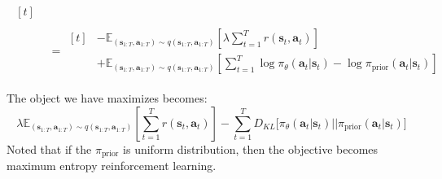 \begin{equation}
\begin{aligned}
\begin{aligned}[t]
        \end{aligned} \\ 
        &= \begin{aligned}[t]
            &-\mathbb{E}_{(\boldsymbol{s}_{1:T}, \boldsymbol{a}_{1:T}) \sim q(\boldsymbol{s}_{1:T}, \boldsymbol{a}_{1:T})} \left[\lambda \sum^T_{t=1}  r(\boldsymbol{s}_t, \boldsymbol{a}_t) \right] \\
            &+ \mathbb{E}_{(\boldsymbol{s}_{1:T}, \boldsymbol{a}_{1:T}) \sim q(\boldsymbol{s}_{1:T}, \boldsymbol{a}_{1:T})} \left[ \sum^T_{t=1} \log \pi_{\theta}(\boldsymbol{a}_t | \boldsymbol{s}_t) - \log \pi_{\text{prior}}(\boldsymbol{a}_t | \boldsymbol{s}_t) \right]
        \end{aligned}
    \end{aligned}
\end{equation}

The object we have maximizes becomes:
\begin{equation}
    \lambda \mathbb{E}_{(\boldsymbol{s}_{1:T}, \boldsymbol{a}_{1:T}) \sim q(\boldsymbol{s}_{1:T}, \boldsymbol{a}_{1:T})} \left[\sum^T_{t=1}  r(\boldsymbol{s}_t, \boldsymbol{a}_t) \right] - \sum^T_{t=1} D_{KL}\Big[ \pi_{\theta} (\boldsymbol{a}_t | \boldsymbol{s}_t) \Big|\Big| \pi_{\text{prior}} (\boldsymbol{a}_t | \boldsymbol{s}_t) \Big]
\end{equation}
Noted that if the $\pi_{\text{prior}}$ is uniform distribution, then the objective becomes maximum entropy reinforcement learning.

